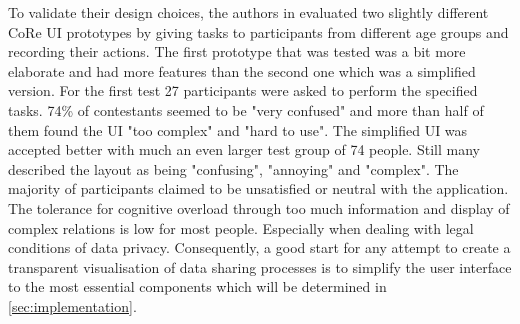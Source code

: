   To validate their design choices, the authors in \cite{cure2020} evaluated two slightly different CoRe UI prototypes by giving tasks to participants from different age groups and recording their actions. The first prototype that was tested was a bit more elaborate and had more features than the second one which was a simplified version. For the first test 27 participants were asked to perform the specified tasks. 74\% of contestants seemed to be "very confused" and more than half of them found the UI "too complex" and "hard to use". The simplified UI was accepted better with much an even larger test group of 74 people. Still many described the layout as being "confusing", "annoying" and "complex". The majority of participants claimed to be unsatisfied or neutral with the application.
  The tolerance for cognitive overload through too much information and display of complex relations is low for most people. Especially when dealing with legal conditions of data privacy. Consequently, a good start for any attempt to create a transparent visualisation of data sharing processes is to simplify the user interface to the most essential components which will be determined in \ref{sec:implementation}. 
